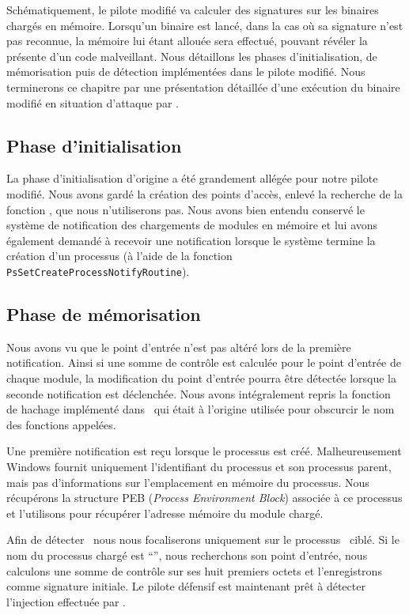 Schématiquement, le pilote modifié va calculer des signatures sur les binaires chargés en mémoire.
Lorsqu'un binaire est lancé, dans la cas où sa signature n'est pas reconnue, la mémoire lui étant allouée sera effectué, pouvant révéler la présente d'un code malveillant.
Nous détaillons les phases d'initialisation, de mémorisation puis de détection implémentées dans le pilote modifié.
Nous terminerons ce chapitre par une présentation détaillée d'une exécution du binaire modifié en situation d'attaque par \duqu.

\subsection{Phase d'initialisation}
La phase d'initialisation d'origine a été grandement allégée pour notre pilote modifié.
Nous avons gardé la création des points d'accès, enlevé la recherche de la fonction \ZwP, que nous n'utiliserons pas.
Nous avons bien entendu conservé le système de notification des chargements de modules en mémoire et lui avons également demandé à recevoir une notification lorsque le système termine la création d'un processus (à l'aide de la fonction \texttt{PsSetCreateProcessNotifyRoutine}).

\subsection{Phase de mémorisation}
Nous avons vu que le point d'entrée n'est pas altéré lors de la première notification.
Ainsi si une somme de contrôle est calculée pour le point d'entrée de chaque module, la modification du point d'entrée pourra être détectée lorsque la seconde notification est déclenchée.
Nous avons intégralement repris la fonction de hachage implémenté dans \duqu\ qui était à l'origine utilisée pour obscurcir le nom des fonctions appelées.

Une première notification est reçu lorsque le processus est créé.
Malheureusement Windows fournit uniquement l'identifiant du processus et son processus parent, mais pas d'informations sur l'emplacement en mémoire du processus.
Nous récupérons la structure PEB (\emph{Process Environment Block}) associée à ce processus et l'utilisons pour récupérer l'adresse mémoire du module chargé.

Afin de détecter \duqu\ nous nous focaliserons uniquement sur le processus \services\ ciblé.
Si le nom du processus chargé est ``\services '', nous recherchons son point d'entrée, nous calculons une somme de contrôle sur ses huit premiers octets et l'enregistrons comme signature initiale.
Le pilote défensif est maintenant prêt à détecter l'injection effectuée par \duqu.


